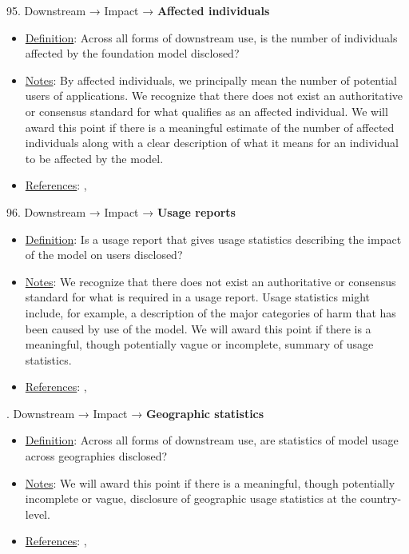 95. Downstream → Impact → \textbf{Affected individuals}
\vspace{-\parskip}
\begin{itemize}
\item
\underline{Definition}: Across all forms of downstream use, is the number of individuals affected by the foundation model disclosed?
\item
\underline{Notes}: By affected individuals, we principally mean the number of potential users of applications. We recognize that there does not exist an authoritative or consensus standard for what qualifies as an affected individual. We will award this point if there is a meaningful estimate of the number of affected individuals along with a clear description of what it means for an individual to be affected by the model.
\item
\underline{References}: \citet{vipra2023concentration}, \citet{bommasani2023ecosystem}
\end{itemize}


96. Downstream → Impact → \textbf{Usage reports}
\vspace{-\parskip}
\begin{itemize}
\item
\underline{Definition}: Is a usage report that gives usage statistics describing the impact of the model on users disclosed?
\item
\underline{Notes}: We recognize that there does not exist an authoritative or consensus standard for what is required in a usage report. Usage statistics might include, for example, a description of the major categories of harm that has been caused by use of the model. We will award this point if there is a meaningful, though potentially vague or incomplete, summary of usage statistics.
\item
\underline{References}: \citet{brown2023allocating}, \citet{bommasani2023ecosystem}
\end{itemize}


. Downstream → Impact → \textbf{Geographic statistics}
\vspace{-\parskip}
\begin{itemize}
\item
\underline{Definition}: Across all forms of downstream use, are statistics of model usage across geographies disclosed?
\item
\underline{Notes}: We will award this point if there is a meaningful, though potentially incomplete or vague, disclosure of geographic usage statistics at the country-level.
\item
\underline{References}: \citet{brown2023allocating}, \citet{bommasani2023ecosystem}
\end{itemize}


